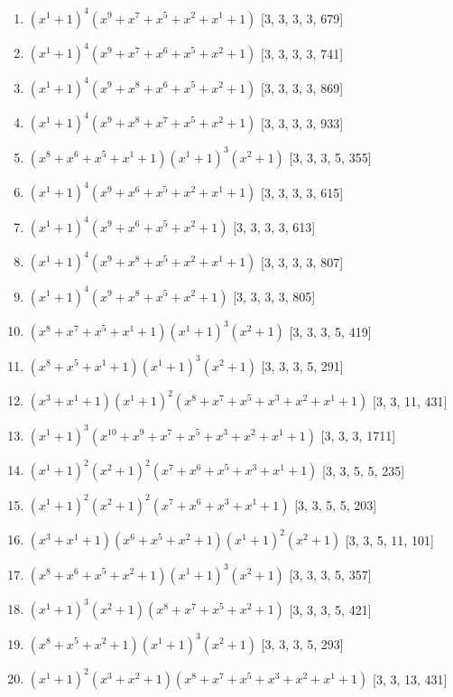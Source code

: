 \documentclass[10pt,twocolumn]{article}
\begin{document}
\begin{enumerate}
\item $(x^{1} + 1)^{4}(x^{9} + x^{7} + x^{5} + x^{2} + x^{1} + 1)$  [3, 3, 3, 3, 679]
\item $(x^{1} + 1)^{4}(x^{9} + x^{7} + x^{6} + x^{5} + x^{2} + 1)$  [3, 3, 3, 3, 741]
\item $(x^{1} + 1)^{4}(x^{9} + x^{8} + x^{6} + x^{5} + x^{2} + 1)$  [3, 3, 3, 3, 869]
\item $(x^{1} + 1)^{4}(x^{9} + x^{8} + x^{7} + x^{5} + x^{2} + 1)$  [3, 3, 3, 3, 933]
\item $(x^{8} + x^{6} + x^{5} + x^{1} + 1)(x^{1} + 1)^{3}(x^{2} + 1)$  [3, 3, 3, 5, 355]
\item $(x^{1} + 1)^{4}(x^{9} + x^{6} + x^{5} + x^{2} + x^{1} + 1)$  [3, 3, 3, 3, 615]
\item $(x^{1} + 1)^{4}(x^{9} + x^{6} + x^{5} + x^{2} + 1)$  [3, 3, 3, 3, 613]
\item $(x^{1} + 1)^{4}(x^{9} + x^{8} + x^{5} + x^{2} + x^{1} + 1)$  [3, 3, 3, 3, 807]
\item $(x^{1} + 1)^{4}(x^{9} + x^{8} + x^{5} + x^{2} + 1)$  [3, 3, 3, 3, 805]
\item $(x^{8} + x^{7} + x^{5} + x^{1} + 1)(x^{1} + 1)^{3}(x^{2} + 1)$  [3, 3, 3, 5, 419]
\item $(x^{8} + x^{5} + x^{1} + 1)(x^{1} + 1)^{3}(x^{2} + 1)$  [3, 3, 3, 5, 291]
\item $(x^{3} + x^{1} + 1)(x^{1} + 1)^{2}(x^{8} + x^{7} + x^{5} + x^{3} + x^{2} + x^{1} + 1)$  [3, 3, 11, 431]
\item $(x^{1} + 1)^{3}(x^{10} + x^{9} + x^{7} + x^{5} + x^{3} + x^{2} + x^{1} + 1)$  [3, 3, 3, 1711]
\item $(x^{1} + 1)^{2}(x^{2} + 1)^{2}(x^{7} + x^{6} + x^{5} + x^{3} + x^{1} + 1)$  [3, 3, 5, 5, 235]
\item $(x^{1} + 1)^{2}(x^{2} + 1)^{2}(x^{7} + x^{6} + x^{3} + x^{1} + 1)$  [3, 3, 5, 5, 203]
\item $(x^{3} + x^{1} + 1)(x^{6} + x^{5} + x^{2} + 1)(x^{1} + 1)^{2}(x^{2} + 1)$  [3, 3, 5, 11, 101]
\item $(x^{8} + x^{6} + x^{5} + x^{2} + 1)(x^{1} + 1)^{3}(x^{2} + 1)$  [3, 3, 3, 5, 357]
\item $(x^{1} + 1)^{3}(x^{2} + 1)(x^{8} + x^{7} + x^{5} + x^{2} + 1)$  [3, 3, 3, 5, 421]
\item $(x^{8} + x^{5} + x^{2} + 1)(x^{1} + 1)^{3}(x^{2} + 1)$  [3, 3, 3, 5, 293]
\item $(x^{1} + 1)^{2}(x^{3} + x^{2} + 1)(x^{8} + x^{7} + x^{5} + x^{3} + x^{2} + x^{1} + 1)$  [3, 3, 13, 431]

\end{enumerate}
\end{document}
